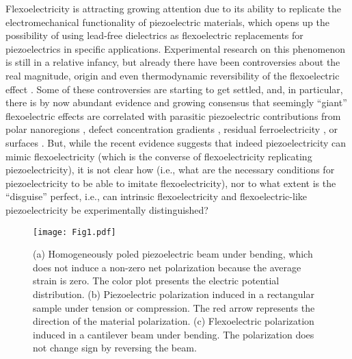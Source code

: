 \documentclass[%
 aps,prl,showpacs,
 amsmath,amssymb,
 reprint,%
]{revtex4-1}
\begin{document}

\maketitle


Flexoelectricity is attracting growing attention due to its ability to replicate the electromechanical functionality of piezoelectric materials, 
which opens up the possibility of using lead-free dielectrics as flexoelectric replacements for piezoelectrics in specific applications\cite{ref:Chu2009,ref:Bhaskar2015}. 
Experimental research on this phenomenon is still in a relative infancy, but already there have been controversies about the real magnitude, origin and even thermodynamic reversibility of the flexoelectric effect \cite{ref:Yudin2013,ref:Zubko2013,ref:Nguyen2013}. 
Some of these controversies are starting to get settled, and, in particular, there is by now abundant evidence and growing consensus that seemingly ``giant'' flexoelectric effects are correlated with parasitic piezoelectric contributions from polar nanoregions \cite{ref:Navarez2014}, defect concentration gradients \cite{ref:Biancoli2015}, residual ferroelectricity \cite{ref:Garten2015}, or surfaces \cite{ref:Tagantsev1986, ref:Narvaez2015, Narvaez2016219}. But, while the recent evidence suggests that indeed piezoelectricity
can mimic flexoelectricity (which is the converse of flexoelectricity replicating piezoelectricity), it is not clear how (i.e., what are the necessary conditions for piezoelectricity to be able to imitate flexoelectricity), nor to what extent is the ``disguise'' perfect, i.e., can intrinsic flexoelectricity and flexoelectric-like piezoelectricity be experimentally distinguished? 

\begin{figure*}[!htp]
\centering
\texttt{[image: Fig1.pdf]}
\caption{ (a) Homogeneously poled piezoelectric beam under bending, which does not induce a non-zero net polarization because the average strain is zero. 
The color plot presents the electric potential distribution. (b) Piezoelectric polarization induced in a rectangular sample under tension or compression. 
The red arrow represents the direction of the material polarization. (c) Flexoelectric polarization induced in a cantilever beam under bending. 
The polarization does not change sign by reversing the beam.}\label{fig1}
\end{figure*}
\end{document}
